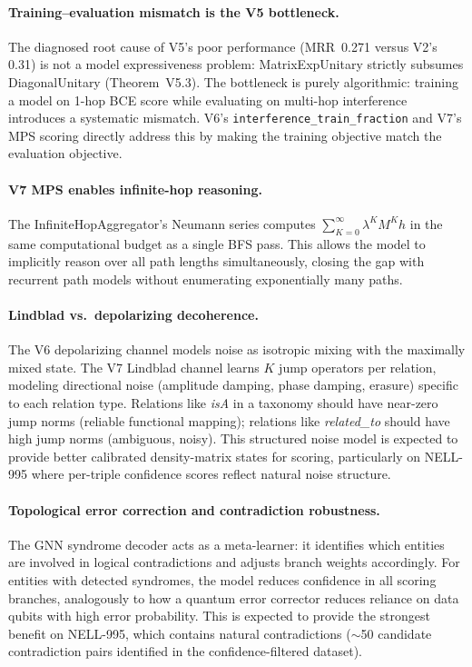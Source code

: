 \documentclass[runningheads]{llncs}
\begin{document}
\paragraph{Training--evaluation mismatch is the V5 bottleneck.}
The diagnosed root cause of V5's poor performance (MRR~0.271 versus V2's
0.31) is not a model expressiveness problem: MatrixExpUnitary strictly
subsumes DiagonalUnitary (Theorem~V5.3).  The bottleneck is purely
algorithmic: training a model on 1-hop BCE score while evaluating on
multi-hop interference introduces a systematic mismatch.  V6's
\texttt{interference\_train\_fraction} and V7's MPS scoring directly address
this by making the training objective match the evaluation objective.

\paragraph{V7 MPS enables infinite-hop reasoning.}
The InfiniteHopAggregator's Neumann series computes
$\sum_{K=0}^\infty\lambda^K M^K h$ in the same computational budget as a
single BFS pass.  This allows the model to implicitly reason over all path
lengths simultaneously, closing the gap with recurrent path models without
enumerating exponentially many paths.

\paragraph{Lindblad vs.\ depolarizing decoherence.}
The V6 depolarizing channel models noise as isotropic mixing with the
maximally mixed state.  The V7 Lindblad channel learns $K$ jump operators
per relation, modeling directional noise (amplitude damping, phase damping,
erasure) specific to each relation type.  Relations like \textit{isA} in a
taxonomy should have near-zero jump norms (reliable functional mapping);
relations like \textit{related\_to} should have high jump norms (ambiguous,
noisy).  This structured noise model is expected to provide better
calibrated density-matrix states for scoring, particularly on NELL-995 where
per-triple confidence scores reflect natural noise structure.

\paragraph{Topological error correction and contradiction robustness.}
The GNN syndrome decoder acts as a meta-learner: it identifies which
entities are involved in logical contradictions and adjusts branch weights
accordingly.  For entities with detected syndromes, the model reduces
confidence in all scoring branches, analogously to how a quantum error
corrector reduces reliance on data qubits with high error probability.  This
is expected to provide the strongest benefit on NELL-995, which contains
natural contradictions ($\sim$50 candidate contradiction pairs identified
in the confidence-filtered dataset).
\end{document}
